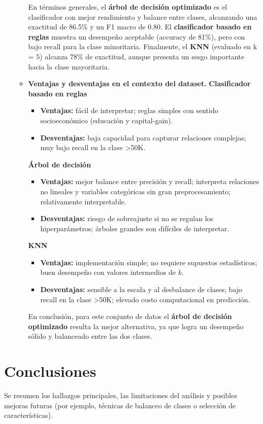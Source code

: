 \documentclass[12pt,a4paper]{article}
\begin{document}
\begin{enumerate}
\begin{itemize}
        En términos generales, el \textbf{árbol de decisión optimizado} es el clasificador con mejor rendimiento y balance entre clases, 
        alcanzando una exactitud de 86.5\% y un F1 macro de 0.80. El \textbf{clasificador basado en reglas} muestra un desempeño aceptable 
        (accuracy de 81\%), pero con bajo recall para la clase minoritaria. Finalmente, el \textbf{KNN} (evaluado en k = 5) alcanza 78\% de exactitud, aunque 
        presenta un sesgo importante hacia la clase mayoritaria.

        \item \textbf{Ventajas y desventajas en el contexto del dataset.}
        \textbf{Clasificador basado en reglas}

        \begin{itemize}
            \item \textbf{Ventajas:} fácil de interpretar; reglas simples con sentido socioeconómico (educación y capital-gain).
            \item \textbf{Desventajas:} baja capacidad para capturar relaciones complejas; muy bajo recall en la clase >50K.
        \end{itemize}

        \textbf{Árbol de decisión}
        \begin{itemize}
            \item \textbf{Ventajas:} mejor balance entre precisión y recall; interpreta relaciones no lineales y variables categóricas sin gran preprocesamiento; relativamente interpretable.
            \item \textbf{Desventajas:} riesgo de sobreajuste si no se regulan los hiperparámetros; árboles grandes son difíciles de interpretar.
        \end{itemize}

        \textbf{KNN}
        \begin{itemize}
            \item \textbf{Ventajas:} implementación simple; no requiere supuestos estadísticos; buen desempeño con valores intermedios de $k$.
            \item \textbf{Desventajas:} sensible a la escala y al desbalance de clases; bajo recall en la clase >50K; elevado costo computacional en predicción.
        \end{itemize}

        En conclusión, para este conjunto de datos el \textbf{árbol de decisión optimizado} resulta la mejor alternativa, ya que logra un 
        desempeño sólido y balanceado entre las dos clases.
      \end{itemize}

\end{enumerate}

\section{Conclusiones}
Se resumen los hallazgos principales, las limitaciones del análisis y posibles mejoras futuras 
(por ejemplo, técnicas de balanceo de clases o selección de características).
\end{document}
